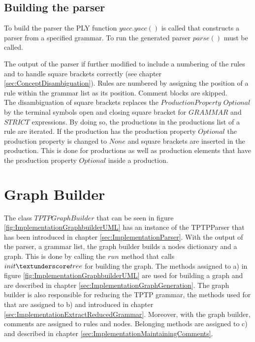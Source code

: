 \subsection{Building the parser}\label{sec:ImplementationRunParser}

To build the parser the \ac{PLY} function $yacc.yacc()$ is called that constructs a parser from a specified grammar. To run the generated parser $parse()$ must be called. 

The output of the parser if further modified to include a numbering of the rules and to handle square brackets correctly (see chapter \ref{sec:ConceptDisambiguation}).
Rules are numbered by assigning the position of a rule within the grammar list as its position. Comment blocks are skipped. \\
The disambiguation of square brackets replaces the $ProductionProperty$ $Optional$ by the terminal symbols open and closing square bracket for $GRAMMAR$ and $STRICT$ expressions.
By doing so, the productions in the productions list of a rule are iterated. If the production has the production property $Optional$ the production property is changed to $None$ and square brackets are inserted in the production. This is done for productions as well as production elements that have the production property $Optional$ inside a production.


\section{Graph Builder}\label{sec:ImplementationGraphBuilder}

The class $TPTPGraphBuilder$ that can be seen in figure \ref{fig:ImplementationGraphbuilderUML} has an instance of the TPTPParser that has been introduced in chapter \ref{sec:ImplementationParser}. With the output of the parser, a grammar list, the graph builder builds a nodes dictionary and a graph. This is done by calling the $run$ method that calls $init\textunderscore tree$ for building the graph.
The methods assigned to a) in figure \ref{fig:ImplementationGraphbuilderUML} are used for building a graph and are described in chapter \ref{sec:ImplementationGraphGeneration}. The graph builder is also responsible for reducing the \ac{TPTP} grammar, the methods used for that are assigned to b) and introduced in chapter \ref{sec:ImplementationExtractReducedGrammar}. Moreover, with the graph builder, comments are assigned to rules and nodes. Belonging methods are assigned to c) and described in chapter \ref{sec:ImplementationMaintainingComments}.

